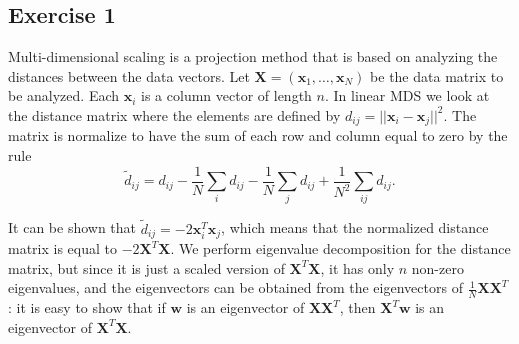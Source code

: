 \documentclass{article}
\renewcommand\vec[1]{\ensuremath{\mathbf{#1}}}
\begin{document}
\subsection{Exercise 1}\label{sec:ex21}
Multi-dimensional scaling is a projection method that is based on analyzing the distances between the data vectors.
Let $\vec X=(\vec x_1,\dots,\vec x_N)$ be the data matrix to be analyzed.
Each $\vec x_i$ is a column vector of length $n$.
In linear MDS we look at the distance matrix where the elements are defined by $d_{ij}=||\vec x_i-\vec x_j||^2$.
The matrix is normalize to have the sum of each row and column equal to zero by the rule
$$ \tilde{d}_{ij} = d_{ij} - \frac{1}{N}\sum_id_{ij} - \frac{1}{N}\sum_jd_{ij} + \frac{1}{N^2}\sum_{ij}d_{ij}. $$

It can be shown that $\tilde{d}_{ij} = -2\vec x_i^T\vec x_j$, which means that the normalized distance matrix is equal to $-2\vec X^T\vec X$.
We perform eigenvalue decomposition for the distance matrix, but since it is just a scaled version of $\vec X^T\vec X$, it has only $n$ non-zero eigenvalues, and the eigenvectors can be obtained from the eigenvectors of $\frac{1}{N}\vec X\vec X^T$: it is easy to show that if $\vec w$ is an eigenvector of $\vec X\vec X^T$, then $\vec X^T\vec w$ is an eigenvector of $\vec X^T\vec X$.
\end{document}
